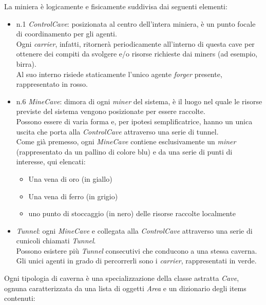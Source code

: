 \documentclass{llncs}
\begin{document}
La miniera è logicamente e fisicamente suddivisa dai seguenti elementi:
\begin{itemize}
	\item n.1 \textit{ControlCave}: posizionata al centro dell'intera miniera, è un punto focale di coordinamento per gli agenti.\\
	Ogni \textit{carrier}, infatti, ritornerà periodicamente all'interno di questa cave per ottenere dei compiti da svolgere e/o risorse richieste dai miners (ad esempio, birra).\\Al suo interno risiede staticamente l'unico agente \textit{forger} presente, rappresentato in rosso.\\
	\item n.6 \textit{MineCave}: dimora di ogni \textit{miner} del sistema, è il luogo nel quale le risorse previste del sistema vengono posizionate per essere raccolte.\\ Possono essere di varia forma e, per ipotesi semplificatrice, hanno un unica uscita che porta alla \textit{ControlCave} attraverso una serie di tunnel.\\
	Come già premesso, ogni \textit{MineCave} contiene esclusivamente un \textit{miner} (rappresentato da un pallino di colore blu) e da una serie di punti di interesse, qui elencati:
	\begin{itemize}
		\item Una vena di oro (in giallo)
		\item Una vena di ferro (in grigio)
		\item uno punto di stoccaggio (in nero) delle risorse raccolte localmente
	\end{itemize}\vspace*{0.4cm}
	
	\item \textit{Tunnel}: ogni \textit{MineCave} e collegata alla \textit{ControlCave} attraverso una serie di cunicoli chiamati \textit{Tunnel}.\\ Possono esistere più \textit{Tunnel} consecutivi che conducono a una stessa caverna.\\ Gli unici agenti in grado di percorrerli sono i \textit{carrier}, rappresentati in verde.
\end{itemize}
Ogni tipologia di caverna è una specializzazione della classe astratta \textit{Cave}, ognuna caratterizzata da una lista di oggetti \textit{Area} e un dizionario degli items contenuti:


\end{document}
